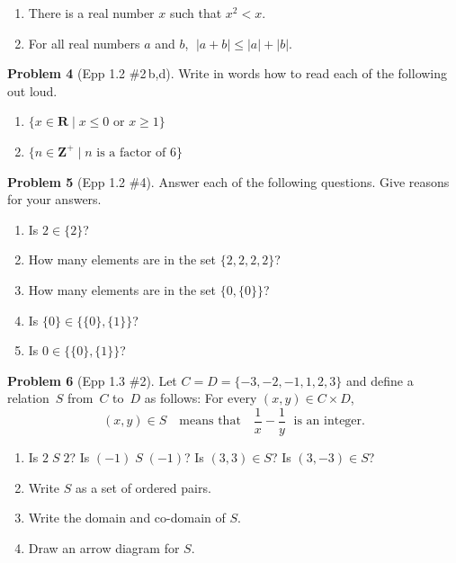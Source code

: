 \documentclass[11pt]{article}
\begin{document}
\begin{enumerate}[label=\textbf{\alph*.},start=2,itemsep=4pt]
  \item There is a real number $x$ such that $x^2 < x$.
  \setcounter{enumi}{3}
  \item For all real numbers $a$ and $b$,
        $\;\lvert a + b \rvert \le \lvert a \rvert + \lvert b \rvert$.
\end{enumerate}

\bigskip

\noindent\textbf{Problem 4} (Epp 1.2 \#2\,b,d). \;
Write in words how to read each of the following out loud.

\begin{enumerate}[label=\textbf{\alph*.},start=2,itemsep=4pt]
  \item $\{x \in \mathbf{R} \mid x \le 0 \text{ or } x \ge 1\}$
  \setcounter{enumi}{3}
  \item $\{n \in \mathbf{Z}^+ \mid n \text{ is a factor of } 6\}$
\end{enumerate}

\bigskip

\noindent\textbf{Problem 5} (Epp 1.2 \#4). \;
Answer each of the following questions. Give reasons for your
answers.

\begin{enumerate}[label=\textbf{\alph*.},itemsep=4pt]
  \item Is $2 \in \{2\}$?
  \item How many elements are in the set $\{2, 2, 2, 2\}$?
  \item How many elements are in the set $\{0, \{0\}\}$?
  \item Is $\{0\} \in \bigl\{\{0\}, \{1\}\bigr\}$?
  \item Is $0 \in \bigl\{\{0\}, \{1\}\bigr\}$?
\end{enumerate}

\bigskip

\noindent\textbf{Problem 6} (Epp 1.3 \#2). \;
Let $C = D = \{-3, -2, -1, 1, 2, 3\}$ and define a relation~$S$
from~$C$ to~$D$ as follows: For every $(x,y) \in C \times D$,
\[
  (x, y) \in S \quad\text{means that}\quad
  \frac{1}{x} - \frac{1}{y} \;\text{ is an integer.}
\]

\begin{enumerate}[label=\textbf{\alph*.},itemsep=4pt]
  \item Is $2\;S\;2$?  Is $(-1)\;S\;(-1)$?
        Is $(3, 3) \in S$?  Is $(3, -3) \in S$?
  \item Write $S$ as a set of ordered pairs.
  \item Write the domain and co-domain of $S$.
  \item Draw an arrow diagram for $S$.
\end{enumerate}
\end{document}
